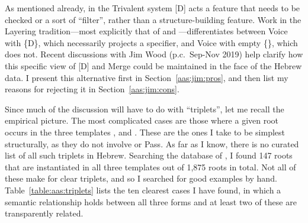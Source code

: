 \begin{exe}
\begin{xlist}
\begin{exe}
\begin{exe}
\begin{xlist}
\begin{exe}
\begin{exe}
\begin{exe}
\begin{exe}
\begin{exe}
\begin{xlist}
\begin{exe}
\label{r1:g:2c2}As mentioned already, in the Trivalent system [D] acts a feature that needs to be checked or a sort of ``filter'', rather than a structure-building feature. Work in the Layering tradition---most explicitly that of \cite{schaefer08} and \cite{wood15springer}---differentiates between Voice with \{D\}, which necessarily projects a specifier, and Voice with empty \{\}, which does not. Recent discussions with Jim Wood (p.c.~Sep-Nov 2019) help clarify how this specific view of [D] and Merge could be maintained in the face of the Hebrew data. I present this alternative first in Section~\ref{aas:jim:pros}, and then list my reasons for rejecting it in Section~\ref{aas:jim:cons}.

Since much of the discussion will have to do with ``triplets'', let me recall the empirical picture. The most complicated cases are those where a given root occurs in the three templates {\tkal}, {\tnif} and {\thif}. These are the ones I take to be simplest structurally, as they do not involve {\va} or Pass. As far as I know, there is no curated list of all such triplets in Hebrew. Searching the database of \cite{ehrenfeld12}, I found 147 roots that are instantiated in all three templates out of 1,875 roots in total. Not all of these make for clear triplets, and so I searched for good examples by hand. Table~\ref{table:aas:triplets} lists the ten clearest cases I have found, in which a semantic relationship holds between all three forms and at least two of these are transparently related.
\begin{table}
\end{table}
\end{exe}
\end{xlist}
\end{exe}
\end{exe}
\end{exe}
\end{exe}
\end{exe}
\end{xlist}
\end{exe}
\end{exe}
\end{xlist}
\end{exe}
